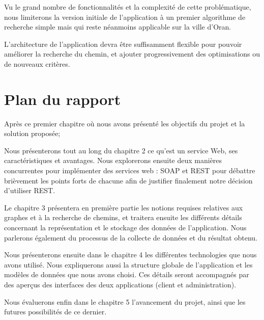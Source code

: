 Vu le grand nombre de fonctionnalités et la complexité de cette problématique, nous limiterons la version initiale de l'application à un premier algorithme de recherche simple mais qui reste néanmoins applicable sur la ville d'Oran.

L'architecture de l'application devra être suffisamment flexible pour pouvoir améliorer la recherche du chemin, et ajouter progressivement des optimisations ou de nouveaux critères.

\section{Plan du rapport}

Après ce premier chapitre où nous avons présenté les objectifs du projet et la solution proposée;

Nous présenterons tout au long du chapitre 2 ce qu'est un service Web, ses caractéristiques et avantages. Nous explorerons ensuite deux manières concurrentes pour implémenter des services web : SOAP et REST pour débattre brièvement les points forts de chacune afin de justifier finalement notre décision d'utiliser REST.

Le chapitre 3 présentera en première partie les notions requises relatives aux graphes et à la recherche de chemins, et traitera ensuite les différents détails concernant la représentation et le stockage des données de l'application. Nous parlerons également du processus de la collecte de données et du résultat obtenu.

Nous présenterons ensuite dans le chapitre 4 les différentes technologies que nous avons utilisé. Nous expliquerons aussi la structure globale de l'application et les modèles de données que nous avons choisi. Ces détails seront accompagnés par des aperçus des interfaces des deux applications (client et administration).

Nous évaluerons enfin dans le chapitre 5 l'avancement du projet, ainsi que les futures possibilités de ce dernier.
